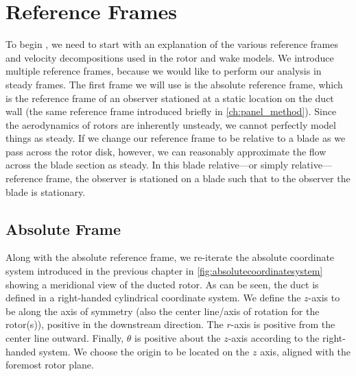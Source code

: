 %
%

\section{Reference Frames}
\label{ssec:reference_frames}

To begin , we need to start with an explanation of the various reference frames and velocity decompositions used in the rotor and wake models.
%
We introduce multiple reference frames, because we would like to perform our analysis in steady frames.
%
The first frame we will use is the absolute reference frame, which is the reference frame of an observer stationed at a static location on the duct wall (the same reference frame introduced briefly in \cref{ch:panel_method}).
%
Since the aerodynamics of rotors are inherently unsteady, we cannot perfectly model things as steady.
%
If we change our reference frame to be relative to a blade as we pass across the rotor disk, however, we can reasonably approximate the flow across the blade section as steady.
%
In this blade relative---or simply relative---reference frame, the observer is stationed on a blade such that to the observer the blade is stationary.

\subsection{Absolute Frame}
\label{ssec:absoluteframe}

Along with the absolute reference frame, we re-iterate the absolute coordinate system introduced in the previous chapter in \cref{fig:absolutecoordinatesystem} showing a meridional view of the ducted rotor.
%
As can be seen, the duct is defined in a right-handed cylindrical coordinate system.
%
We define the \(z\)-axis to be along the axis of symmetry (also the center line/axis of rotation for the rotor(s)), positive in the downstream direction.
%
The \(r\)-axis is positive from the center line outward.
%
Finally, \(\theta\) is positive about the \(z\)-axis according to the right-handed system.
%
%
We choose the origin to be located on the \(z\) axis, aligned with the foremost rotor plane.
%    

